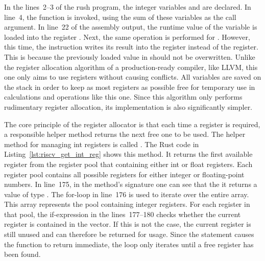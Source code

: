 In the lines~2--3 of the rush program, the integer variables  and  are declared.
In line~4, the  function is invoked, using the sum of these variables as the call argument.
In line~22 of the assembly output, the runtime value of the variable  is loaded into the register .
Next, the same operation is performed for  .
However, this time, the instruction writes its result into the  register instead of the  register.
This is because the previously loaded value in  should not be overwritten.
Unlike the register allocation algorithm of a production-ready compiler, like LLVM,
this one only aims to use registers without causing conflicts.
All variables are saved on the stack in order to keep as most registers as possible free for temporary use in calculations and operations like this one.
Since this algorithm only performs rudimentary register allocation, its implementation is also significantly simpler.

The core principle of the register allocator is that each time a register is required,
a responsible helper method returns the next free one to be used.
The helper method for managing int registers is called .
The Rust code in Listing~\ref{lst:riscv_get_int_reg} shows this method.%
%
%
%
It returns the first available register from the register pool that containing either int or float registers.
Each register pool contains all possible registers for either integer or floating-point numbers.
In line~175, in the method's signature one can see that the it returns a value of type .
The for-loop in line~176 is used to iterate over the entire  array.
This array represents the pool containing integer registers.
For each register in that pool, the if-expression in the lines~177--180 checks whether the current register  is contained in the  vector.
If this is not the case, the current register is still unused and can therefore be returned for usage.
Since the  statement causes the function to return immediate,
the loop only iterates until a free register has been found.

